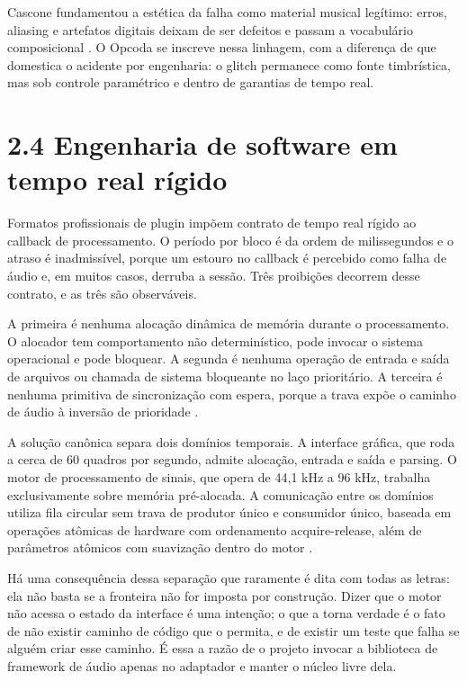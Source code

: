 \documentclass[12pt,a4paper]{article}
\begin{document}
Cascone fundamentou a estética da falha como material musical legítimo: erros, aliasing e artefatos digitais deixam de ser defeitos e passam a vocabulário composicional \cite{cascone2000}. O Opcoda se inscreve nessa linhagem, com a diferença de que domestica o acidente por engenharia: o glitch permanece como fonte timbrística, mas sob controle paramétrico e dentro de garantias de tempo real.


\section*{2.4 Engenharia de software em tempo real rígido}

Formatos profissionais de plugin impõem contrato de tempo real rígido ao callback de processamento. O período por bloco é da ordem de milissegundos e o atraso é inadmissível, porque um estouro no callback é percebido como falha de áudio e, em muitos casos, derruba a sessão. Três proibições decorrem desse contrato, e as três são observáveis.


A primeira é nenhuma alocação dinâmica de memória durante o processamento. O alocador tem comportamento não determinístico, pode invocar o sistema operacional e pode bloquear. A segunda é nenhuma operação de entrada e saída de arquivos ou chamada de sistema bloqueante no laço prioritário. A terceira é nenhuma primitiva de sincronização com espera, porque a trava expõe o caminho de áudio à inversão de prioridade \cite{steinbergvst3, clap2024, pirkle2019}.


A solução canônica separa dois domínios temporais. A interface gráfica, que roda a cerca de 60 quadros por segundo, admite alocação, entrada e saída e parsing. O motor de processamento de sinais, que opera de 44,1 kHz a 96 kHz, trabalha exclusivamente sobre memória pré-alocada. A comunicação entre os domínios utiliza fila circular sem trava de produtor único e consumidor único, baseada em operações atômicas de hardware com ordenamento acquire-release, além de parâmetros atômicos com suavização dentro do motor \cite{pirkle2019}.


Há uma consequência dessa separação que raramente é dita com todas as letras: ela não basta se a fronteira não for imposta por construção. Dizer que o motor não acessa o estado da interface é uma intenção; o que a torna verdade é o fato de não existir caminho de código que o permita, e de existir um teste que falha se alguém criar esse caminho. É essa a razão de o projeto invocar a biblioteca de framework de áudio apenas no adaptador e manter o núcleo livre dela.
\end{document}
